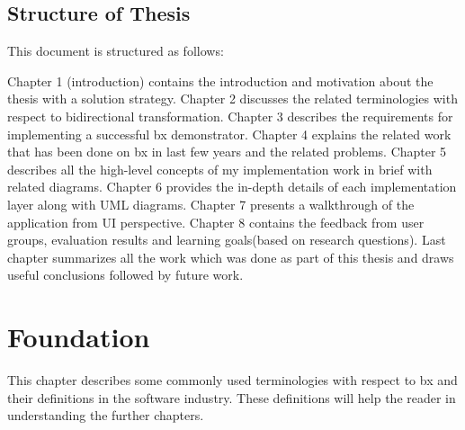 \subsection{Structure of Thesis}\label{subsec:structure}
This document is structured as follows: 

Chapter 1 (introduction) contains the introduction and motivation about the thesis with a solution strategy. Chapter 2 discusses the related terminologies with respect to bidirectional transformation. Chapter 3 describes the requirements for implementing a successful bx demonstrator. Chapter 4 explains the related work that has been done on bx in last few years and the related problems. Chapter 5 describes all the high-level concepts of my implementation work in brief with related diagrams. Chapter 6 provides the in-depth details of each implementation layer along with UML diagrams. Chapter 7 presents a walkthrough of the application from UI perspective. Chapter 8 contains the feedback from user groups, evaluation results and learning goals(based on research questions). Last chapter summarizes all the work which was done as part of this thesis and draws useful conclusions followed by future work.

\section{Foundation}\label{sec:foundation}
This chapter describes some commonly used terminologies with respect to bx and their definitions in the software industry. These definitions will help the reader in understanding the further chapters.

